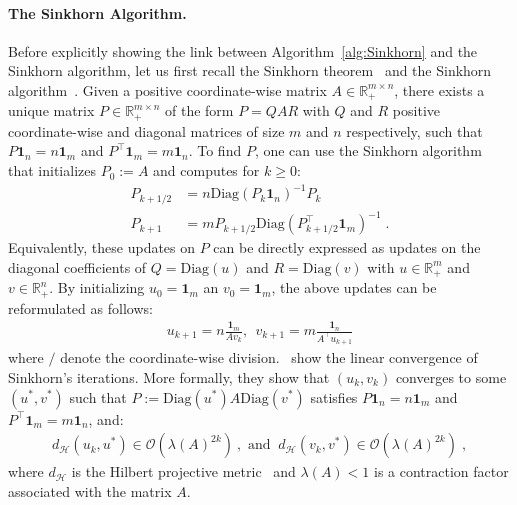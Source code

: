 \paragraph{The Sinkhorn Algorithm.} Before explicitly showing the link between Algorithm~\ref{alg:Sinkhorn} and the Sinkhorn algorithm, let us first recall the Sinkhorn theorem~\cite{sinkhorn1964relationship} and the Sinkhorn algorithm~\cite{sinkhorn1967concerning}. Given a positive coordinate-wise matrix $A\in\mathbb{R}_{+}^{m\times n}$, there exists a unique matrix $P\in\mathbb{R}_{+}^{m\times n}$ of the form $P=QAR$ with $Q$ and $R$ positive coordinate-wise and diagonal matrices of size $m$ and $n$ respectively, such that $P\bm{1}_n=n\bm{1}_m$ and $P^\top\bm{1}_m=m\bm{1}_n$. To find $P$, one can use the Sinkhorn algorithm that initializes $P_0:=A$ and computes for $k\geq 0$:
\begin{align*}
    P_{k+1/2}&=n\text{Diag}(P_k\bm{1}_n)^{-1}P_k\\
    P_{k+1}&=m P_{k+1/2}\text{Diag}(P_{k+1/2}^\top\bm{1}_m)^{-1}\; .
\end{align*}
Equivalently, these updates on $P$ can be directly expressed as updates on the diagonal coefficients of $Q=\text{Diag}(u)$ and $R=\text{Diag}(v)$ with $u\in\mathbb{R}_{+}^m$ and $v\in\mathbb{R}_{+}^n$. By initializing $u_0=\bm{1}_m$ an $v_0=\bm{1}_m$, the above updates can be reformulated as follows:
\begin{align}
\label{eq:update-diag-sin}
    u_{k+1} = n\frac{ \bm{1}_m}{Av_k},~~v_{k+1} = m\frac{\bm{1}_n}{ A^\top u_{k+1}}
\end{align}
where $/$ denote the coordinate-wise division.~\citet{franklin1989scaling} show the linear convergence of Sinkhorn’s iterations. More formally, they show that $(u_k, v_k)$ converges to some $(u^*,v^*)$ such that $P:=\text{Diag}(u^*)A\text{Diag}(v^*)$ satisfies $P\bm{1}_n=n\bm{1}_m$ and $P^\top\bm{1}_m=m\bm{1}_n$, and:
\begin{align*}
    d_\mathcal{H}(u_k, u^*)\in\mathcal{O}(\lambda(A)^{2k})~, \text{ and } ~d_\mathcal{H}(v_k, v^*)\in\mathcal{O}(\lambda(A)^{2k})\; ,
\end{align*}
where $d_{\mathcal{H}}$ is the Hilbert projective metric~\cite{de1993hilbert} and $\lambda(A)<1$ is a contraction factor associated with the matrix $A$.


